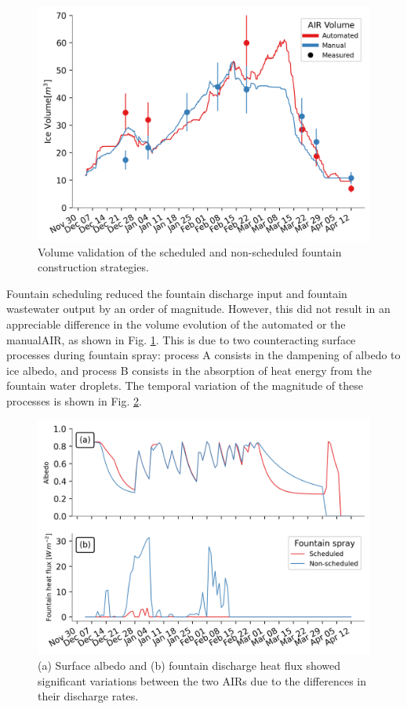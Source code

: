 \begin{figure}[htb] \includegraphics[width=\textwidth] {figs/CH_validation.png} \caption{Volume validation of the
		scheduled and non-scheduled fountain construction strategies.} \label{fig:validation} \end{figure}

Fountain scheduling reduced the fountain discharge input and fountain wastewater output by an order of
magnitude. However, this did not result in an appreciable difference in the volume evolution of the automated
or the manual\ac{AIR}, as shown in Fig. \ref{fig:validation}. This is due to two counteracting surface processes
during fountain spray: process A consists in the dampening of albedo to ice albedo, and process B consists in the
absorption of heat energy from the fountain water droplets. The temporal variation of the magnitude of these
processes is shown in Fig. \ref{fig:dis_processes}.

\begin{figure}[htb]
	\includegraphics[width=\textwidth]{figs/dis_processes.png}
	\caption{(a) Surface albedo  and (b) fountain discharge heat flux showed significant variations between the two
		\ac{AIRs} due to the differences in their discharge rates.}
	\label{fig:dis_processes}
\end{figure}

